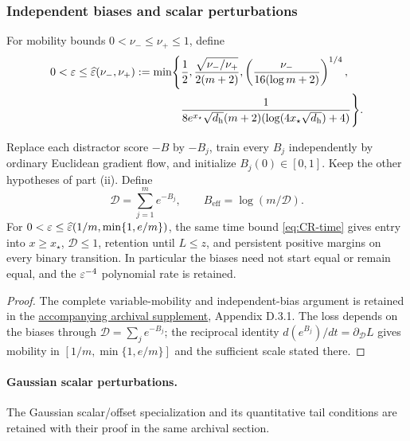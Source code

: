 \subsubsection{Independent biases and scalar perturbations}
\label{app:CR-independent}
For mobility bounds $0<\nu_-\le\nu_+\le1$, define
\begin{equation}
 \begin{aligned}
 0<\varepsilon\le\widehat{\varepsilon}(\nu_-,\nu_+):=\min\Biggl\{&\frac12,
 \frac{\sqrt{\nu_-/\nu_+}}{2(m+2)},
 \left(\frac{\nu_-}{16(\log m+2)}\right)^{1/4},\\
 &\frac1{8e^{x_\star}\sqrt{d_{\mathrm h}}(m+2)(\log(4x_\star\sqrt{d_{\mathrm h}})+4)}\Biggr\}.
 \end{aligned}
 \label{eq:CR-variable-scale}
\end{equation}
\begin{corollary}
\label{cor:CR-independent}
Replace each distractor score $-B$ by $-B_j$, train every $B_j$ independently by ordinary Euclidean gradient flow,
and initialize $B_j(0)\in[0,1]$. Keep the other hypotheses of part (ii).
Define
\[
 \mathcal D=\sum_{j=1}^m e^{-B_j},\qquad B_{\mathrm{eff}}=\log(m/\mathcal D).
\]
For $0<\varepsilon\le\widehat{\varepsilon}(1/m,\min\{1,e/m\})$, the same time bound \cref{eq:CR-time} gives
entry into $x\ge x_\star$, $\mathcal D\le1$, retention until $L\le z$, and persistent positive margins on every binary transition.
In particular the biases need not start equal or remain equal, and the $\varepsilon^{-4}$ polynomial rate is retained.
\end{corollary}
\begin{proof}
The complete variable-mobility and independent-bias argument is retained in the
\href{archival_full_version.pdf}{accompanying archival supplement}, Appendix D.3.1.
The loss depends on the biases through $\mathcal D=\sum_j e^{-B_j}$; the reciprocal
identity $d(e^{B_j})/dt=\partial_{\mathcal D}L$ gives mobility in
$[1/m,\min\{1,e/m\}]$ and the sufficient scale stated there.
\end{proof}
\paragraph{Gaussian scalar perturbations.}\label{cor:CR-scalar-Gaussian}
The Gaussian scalar/offset specialization and its quantitative tail conditions
are retained with their proof in the same archival section.
